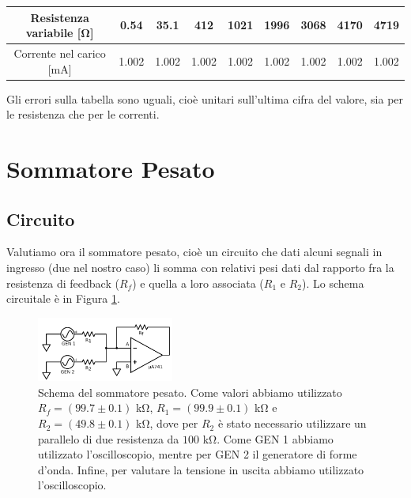 \begin{center}
\begin{tabular}{c|c|c|c|c|c|c|c|c}
Resistenza variabile [\si{\ohm}] & 0.54 & 35.1 & 412 & 1021 & 1996 & 3068 & 4170 & 4719 \\ 
\hline 
Corrente nel carico [\si{\milli\ampere}] & 1.002 & 1.002 & 1.002 & 1.002 & 1.002 & 1.002 & 1.002 & 1.002 \\ 
\end{tabular}
\end{center}

Gli errori sulla tabella sono uguali, cioè unitari sull'ultima cifra del valore, sia per le resistenza che per le correnti.

\section{Sommatore Pesato}

\subsection{Circuito}

Valutiamo ora il sommatore pesato, cioè un circuito che dati alcuni segnali in ingresso (due nel nostro caso) li somma con relativi pesi dati dal rapporto fra la resistenza di feedback ($R_f$) e quella a loro associata ($R_1$ e $R_2$). Lo schema circuitale è in Figura \ref{sommatore_pesato}.

\begin{figure}
  \begin{center}
    \includegraphics[width=0.40\textwidth]{../E01/latex/c2.pdf}
  \end{center}
  \caption{Schema del sommatore pesato. Come valori abbiamo utilizzato $R_f=(99.7 \pm 0.1)$ \si{\kilo\ohm}, $R_1=(99.9 \pm 0.1)$ \si{\kilo\ohm} e $R_2=(49.8 \pm 0.1)$ \si{\kilo\ohm}, dove per $R_2$ è stato necessario utilizzare un parallelo di due resistenza da $100$ \si{\kilo\ohm}. Come GEN 1 abbiamo utilizzato l'oscilloscopio, mentre per GEN 2 il generatore di forme d'onda. Infine, per valutare la tensione in uscita abbiamo utilizzato l'oscilloscopio.}
  \label{sommatore_pesato}
\end{figure}


